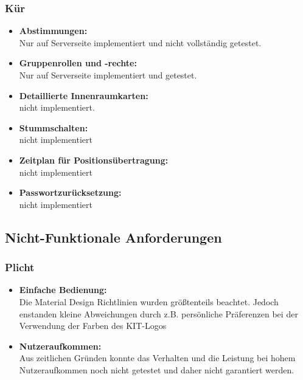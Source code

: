 \documentclass[parskip=full,11pt]{scrartcl}
\begin{document}
		\subsubsection{Kür}
			\begin{itemize}
                \item \textbf{Abstimmungen:}\\
							Nur auf Serverseite implementiert und nicht vollständig getestet.
                \item \textbf{Gruppenrollen und -rechte:}\\
							Nur auf Serverseite implementiert und getestet.
                \item \textbf{Detaillierte Innenraumkarten:}\\
							nicht implementiert.
                \item \textbf{Stummschalten:}\\
							nicht implementiert
                \item \textbf{Zeitplan für Positionsübertragung:}\\
							nicht implementiert
                \item \textbf{Passwortzurücksetzung:}\\
							nicht implementiert
			\end{itemize}

	\subsection{Nicht-Funktionale Anforderungen}
		\subsubsection{Plicht}
			\begin{itemize}
                \item \textbf{Einfache Bedienung:}\\
											Die Material Design Richtlinien wurden größtenteils
											beachtet. Jedoch enstanden kleine Abweichungen
											durch z.B. persönliche Präferenzen bei der Verwendung
											der Farben des KIT-Logos
                \item \textbf{Nutzeraufkommen:}\\
											Aus zeitlichen Gründen konnte das Verhalten und die
											Leistung bei hohem Nutzeraufkommen noch nicht getestet
											und daher nicht garantiert werden.
			\end{itemize}
\end{document}
